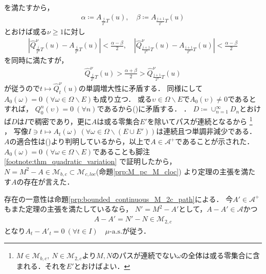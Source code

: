 \begin{prf}
\begin{description}
{\begin{align}
						\label{eq:thm_quadratic_variation_2}
					\end{align}
					を満たすから，
					\begin{align}
						\alpha \coloneqq A_{\frac{j}{2^n}T}(u),
						\quad \beta \coloneqq A_{\frac{j+1}{2^n}T}(u)
					\end{align}
					とおけば或る$\nu \geq 1$に対し
					\begin{align}
						\left| \hat{Q}_{\frac{j}{2^n}T}^\nu(u) - A_{\frac{j}{2^n}T}(u) \right| < \frac{\alpha - \beta}{2},
						\quad \left| \hat{Q}_{\frac{j+1}{2^n}T}^\nu(u) - A_{\frac{j+1}{2^n}T}(u) \right| < \frac{\alpha - \beta}{2}
					\end{align}
					を同時に満たすが，
					\begin{align}
						\hat{Q}_{\frac{j}{2^n}T}^\nu(u) > \frac{\alpha + \beta}{2} > \hat{Q}_{\frac{j+1}{2^n}T}^\nu(u)
					\end{align}
					が従うので$t \longmapsto \hat{Q}_t^\nu(u)$の単調増大性に矛盾する．
					同様にして$A_0(\omega) = 0\ (\forall \omega \in \Omega \backslash E)$も成り立つ．
					或る$\upsilon \in \Omega \backslash E$で$A_0(\upsilon) \neq 0$であるとすれば，
					$Q^n_0(\upsilon) = 0\ (\forall n)$であるから()に矛盾する．
					\label{footnote:thm_quadratic_variation}
				}．
				$D \coloneqq \cup_{n=1}^{\infty} D_n$とおけば$D$は$I$で稠密であり，更に$A$は或る零集合$E'$を除いてパスが連続となるから
				\footnote{
					$M \in \mathcal{M}_{b,c},\ N \in \mathcal{M}_{2,c}$より$M,N$のパスが連続でない$\omega$の全体は或る零集合に含まれる．それを$E'$とおけばよい．
				}
				，
				写像$I \ni t \longmapsto A_t(\omega)\ (\forall \omega \in \Omega \backslash (E \cup E'))$は連続且つ単調非減少である．
				$A$の適合性は()より判明しているから，以上で$A \in \mathcal{A}^+$であることが示された．
				$A_0(\omega) = 0\ (\forall \omega \in \Omega \backslash E)$であることも脚注\ref{footnote:thm_quadratic_variation}
				で証明したから，$N = M^2 - A \in \mathcal{M}_{b,c} \subset \mathcal{M}_{c,loc}$(命題\ref{prp:M_pc_M_cloc})
				より定理の主張を満たす$A$の存在が言えた．
				
				存在の一意性は命題\ref{prp:bounded_continuous_M_2c_path}による．
				今$A' \in \mathcal{A}^+$もまた定理の主張を満たしているなら，
				$N' = M^2 - A'$として，$A - A' \in \mathcal{A}$かつ
				\begin{align}
					A - A' = N' - N \in \mathcal{M}_{2,c}
				\end{align}
				となり$A_t - A'_t = 0\ (\forall t \in I)\quad \mbox{$\mu$-a.s.}$が従う．
				

\end{description}
\end{prf}
